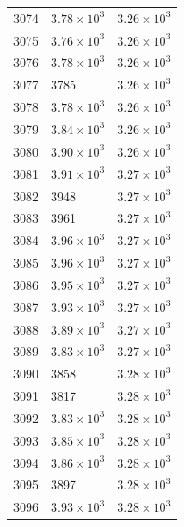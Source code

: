 \begin{table}[H]
\begin{tabular}{lll}
3074 & $\displaystyle 3.78 \times 10^{3}$ & $\displaystyle 3.26 \times 10^{3}$ \\
3075 & $\displaystyle 3.76 \times 10^{3}$ & $\displaystyle 3.26 \times 10^{3}$ \\
3076 & $\displaystyle 3.78 \times 10^{3}$ & $\displaystyle 3.26 \times 10^{3}$ \\
3077 & 3785 & $\displaystyle 3.26 \times 10^{3}$ \\
3078 & $\displaystyle 3.78 \times 10^{3}$ & $\displaystyle 3.26 \times 10^{3}$ \\
3079 & $\displaystyle 3.84 \times 10^{3}$ & $\displaystyle 3.26 \times 10^{3}$ \\
3080 & $\displaystyle 3.90 \times 10^{3}$ & $\displaystyle 3.26 \times 10^{3}$ \\
3081 & $\displaystyle 3.91 \times 10^{3}$ & $\displaystyle 3.27 \times 10^{3}$ \\
3082 & 3948 & $\displaystyle 3.27 \times 10^{3}$ \\
3083 & 3961 & $\displaystyle 3.27 \times 10^{3}$ \\
3084 & $\displaystyle 3.96 \times 10^{3}$ & $\displaystyle 3.27 \times 10^{3}$ \\
3085 & $\displaystyle 3.96 \times 10^{3}$ & $\displaystyle 3.27 \times 10^{3}$ \\
3086 & $\displaystyle 3.95 \times 10^{3}$ & $\displaystyle 3.27 \times 10^{3}$ \\
3087 & $\displaystyle 3.93 \times 10^{3}$ & $\displaystyle 3.27 \times 10^{3}$ \\
3088 & $\displaystyle 3.89 \times 10^{3}$ & $\displaystyle 3.27 \times 10^{3}$ \\
3089 & $\displaystyle 3.83 \times 10^{3}$ & $\displaystyle 3.27 \times 10^{3}$ \\
3090 & 3858 & $\displaystyle 3.28 \times 10^{3}$ \\
3091 & 3817 & $\displaystyle 3.28 \times 10^{3}$ \\
3092 & $\displaystyle 3.83 \times 10^{3}$ & $\displaystyle 3.28 \times 10^{3}$ \\
3093 & $\displaystyle 3.85 \times 10^{3}$ & $\displaystyle 3.28 \times 10^{3}$ \\
3094 & $\displaystyle 3.86 \times 10^{3}$ & $\displaystyle 3.28 \times 10^{3}$ \\
3095 & 3897 & $\displaystyle 3.28 \times 10^{3}$ \\
3096 & $\displaystyle 3.93 \times 10^{3}$ & $\displaystyle 3.28 \times 10^{3}$ \\

\end{tabular}
\end{table}
